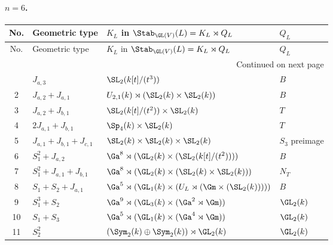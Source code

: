 \paragraph{$n=6$.}
\begin{longtable}{@{}c p{} p{} p{}@{}}
\toprule
No. & Geometric type & $K_L$ in $\Stab_{\GL(V)}(L)=K_L\rtimes Q_L$ & $Q_L$ \\
\midrule
\endfirsthead
\toprule
No. & Geometric type & $K_L$ in $\Stab_{\GL(V)}(L)=K_L\rtimes Q_L$ & $Q_L$ \\
\midrule
\endhead
\midrule
\multicolumn{4}{r}{Continued on next page}\\
\midrule
\endfoot
\bottomrule
\endlastfoot
1 & $J_{a,3}$ & $\SL_2(k[t]/(t^3))$ & $B$ \\
2 & $J_{a,2} + J_{a,1}$ & $U_{2,1}(k)\rtimes (\SL_2(k)\times \SL_2(k))$ & $B$ \\
3 & $J_{a,2} + J_{b,1}$ & $\SL_2(k[t]/(t^2))\times \SL_2(k)$ & $T$ \\
4 & $2J_{a,1} + J_{b,1}$ & $\Sp_4(k)\times \SL_2(k)$ & $T$ \\
5 & $J_{a,1} + J_{b,1} + J_{c,1}$ & $\SL_2(k)\times \SL_2(k)\times \SL_2(k)$ & $S_3$ preimage \\
6 & $S_1^2 + J_{a,2}$ & $\Ga^{8}\rtimes (\GL_2(k)\times (\SL_2(k[t]/(t^2))))$ & $B$ \\
7 & $S_1^2 + J_{a,1} + J_{b,1}$ & $\Ga^{8}\rtimes (\GL_2(k)\times (\SL_2(k)\times \SL_2(k)))$ & $N_T$ \\
8 & $S_1 + S_2 + J_{a,1}$ & $\Ga^{5}\rtimes (\GL_1(k)\times (U_L\rtimes (\Gm\times (\SL_2(k)))))$ & $B$ \\
9 & $S_1^3 + S_2$ & $\Ga^{9}\rtimes (\GL_3(k)\times (\Ga^{2}\rtimes \Gm))$ & $\GL_2(k)$ \\
10 & $S_1 + S_3$ & $\Ga^{5}\rtimes (\GL_1(k)\times (\Ga^{4}\rtimes \Gm))$ & $\GL_2(k)$ \\
11 & $S_2^2$ & $(\Sym_2(k)\oplus \Sym_2(k))\rtimes \GL_2(k)$ & $\GL_2(k)$ \\
\end{longtable}

